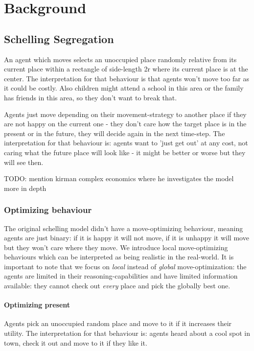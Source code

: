 \section{Background}

\subsection{Schelling Segregation}
\cite{schelling_dynamic_1971}

An agent which moves selects an unoccupied place randomly relative from its current place within a rectangle of side-length 2r where its current place is at the center. The interpretation for that behaviour is that agents won't move too far as it could be costly. Also children might attend a school in this area or the family has friends in this area, so they don't want to break that.

Agents just move depending on their movement-strategy to another place if they are not happy on the current one - they don't care how the target place is in the present or in the future, they will decide again in the next time-step. The interpretation for that behaviour is: agents want to 'just get out' at any cost, not caring what the future place will look like - it might be better or worse but they will see then.

TODO: mention kirman complex economics where he investigates the model more in depth

\subsubsection{Optimizing behaviour}
The original schelling model didn't have a move-optimizing behaviour, meaning agents are just binary: if it is happy it will not move, if it is unhappy it will move but they won't care where they move. We introduce local move-optimizing behaviours which can be interpreted as being realistic in the real-world. It is important to note that we focus on \textit{local} instead of \textit{global} move-optimization: the agents are limited in their reasoning-capabilities and have limited information available: they cannot check out \textit{every} place and pick the globally best one.

\paragraph{Optimizing present} Agents pick an unoccupied random place and move to it if it increases their utility. The interpretation for that behaviour is: agents heard about a cool spot in town, check it out and move to it if they like it.

